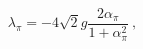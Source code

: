 \begin{equation} 
	\lambda_\pi=-4\sqrt{2}g\frac{2\alpha_{\pi}}{1+\alpha^{2}_{\pi}}\ ,
	\end{equation} 
